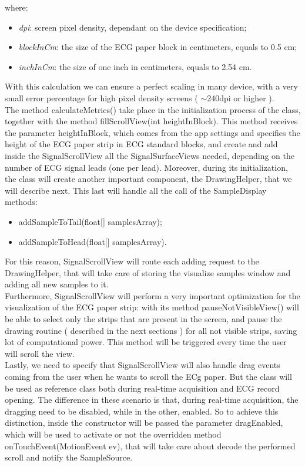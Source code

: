 where:
\begin{itemize}
	\item \textit{dpi}: screen pixel density, dependant on the device specification;
	\item \textit{blockInCm}: the size of the ECG paper block in centimeters, equals to 0.5 cm;
	\item \textit{inchInCm}: the size of one inch in centimeters, equals to 2.54 cm.
\end{itemize}
With this calculation we can ensure a perfect scaling in many device, with a very small error percentage for high pixel density screens ( $\sim$240dpi or higher ).\\
The method calculateMetrics() take place in the initialization process of the class, together with the method fillScrollView(int heightInBlock). This method receives the parameter heightInBlock, which comes from the app settings and specifies the height of the ECG paper strip in ECG standard blocks, and create and add inside the SignalScrollView all the SignalSurfaceViews needed, depending on the number of ECG signal leads (one per lead). Moreover, during its initialization, the class will create another important component, the DrawingHelper, that we will describe next. This last will handle all the call of the SampleDisplay methods:
\begin{itemize}
	\item addSampleToTail(float[] samplesArray);
	\item addSampleToHead(float[] samplesArray).
\end{itemize}
For this reason, SignalScrollView will route each adding request to the DrawingHelper, that will take care of storing the visualize samples window and adding all new samples to it.\\
Furthermore, SignalScrollView will perform a very important optimization for the visualization of the ECG paper strip: with its method pauseNotVisibleView() will be able to select only the strips that are present in the screen, and pause the drawing routine ( described in the next sections ) for all not visible strips, saving lot of computational power. This method will be triggered every time the user will scroll the view.\\
Lastly, we need to specify that SignalScrollView will also handle drag events coming from the user when he wants to scroll the ECg paper. But the class will be used as reference class both during real-time acquisition and ECG record opening. The difference in these scenario is that, during real-time acquisition, the dragging need to be disabled, while in the other, enabled. So to achieve this distinction, inside the constructor will be passed the parameter dragEnabled, which will be used to activate or not the overridden method onTouchEvent(MotionEvent ev), that will take care about decode the performed scroll and notify the SampleSource.\\
